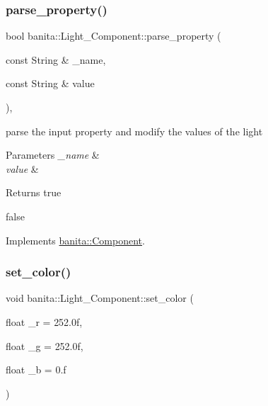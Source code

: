 \subsubsection{\texorpdfstring{parse\_property()}{parse\_property()}}
{\footnotesize\ttfamily bool banita\+::\+Light\+\_\+\+Component\+::parse\+\_\+property (\begin{DoxyParamCaption}\item[{const String \&}]{\+\_\+name,  }\item[{const String \&}]{value }\end{DoxyParamCaption})\hspace{0.3cm}{\ttfamily [override]}, {\ttfamily [virtual]}}



parse the input property and modify the values of the light 


\begin{DoxyParams}{Parameters}
{\em \+\_\+name} & \\
\hline
{\em value} & \\
\hline
\end{DoxyParams}
\begin{DoxyReturn}{Returns}
true 

false 
\end{DoxyReturn}


Implements \mbox{\hyperlink{classbanita_1_1_component_a619154ef2bed8e4493413bdef6117716}{banita\+::\+Component}}.

\mbox{\label{classbanita_1_1_light___component_a92916e5a6493c735954aec600c1aa77f}} 
\subsubsection{\texorpdfstring{set\_color()}{set\_color()}\hspace{0.1cm}{\footnotesize\ttfamily [1/2]}}
{\footnotesize\ttfamily void banita\+::\+Light\+\_\+\+Component\+::set\+\_\+color (\begin{DoxyParamCaption}\item[{float}]{\+\_\+r = {\ttfamily 252.0f},  }\item[{float}]{\+\_\+g = {\ttfamily 252.0f},  }\item[{float}]{\+\_\+b = {\ttfamily 0.f} }\end{DoxyParamCaption})}



